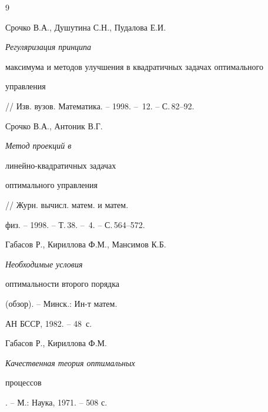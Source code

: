 \begin{thebibliography}{9}







Срочко В.А., Душутина С.Н., Пудалова Е.И. 


{\em Регуляризация принципа


максимума и методов улучшения в квадратичных задачах оптимального


управления} // Изв. вузов. Математика. -- 1998. -- \No\,12. -- С.\,82--92.




Срочко В.А., Антоник В.Г. {\em Метод проекций в


линейно-квадратичных задачах


оптимального управления} // Журн. вычисл. матем. и матем.


физ. -- 1998. -- Т.\,38. -- \No\,4. -- С.\,564--572.




Габасов Р., Кириллова Ф.М., Мансимов К.Б. {\em Необходимые условия


оптимальности второго порядка} (обзор). -- Минск.: Ин-т матем.


АН БССР, 1982. -- 48~с.




Габасов Р., Кириллова Ф.М. {\em Качественная теория оптимальных


процессов}. -- М.: Наука, 1971. -- 508 с.





\end{thebibliography}





\vskip 2cm












\label{end}






